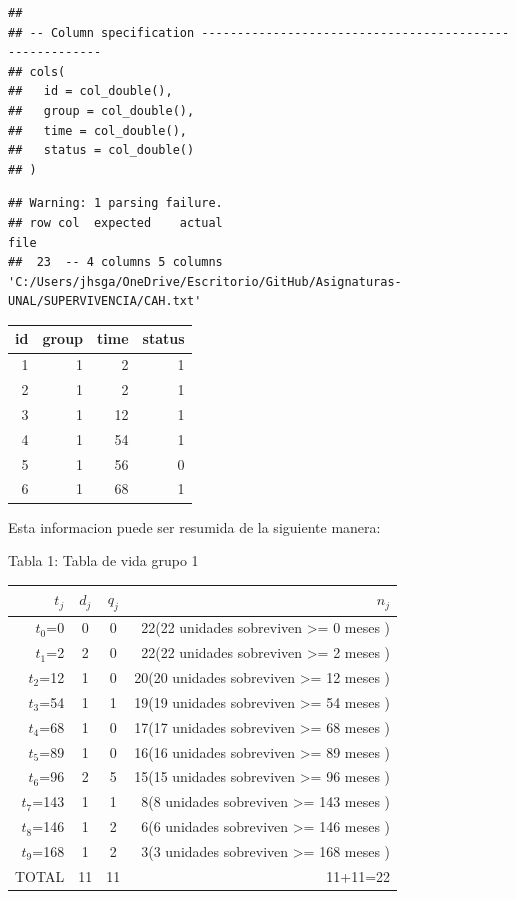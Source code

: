 \documentclass[
  12pt,
  letterpaper,
]{article}
\begin{document}
\begin{verbatim}
## 
## -- Column specification --------------------------------------------------------
## cols(
##   id = col_double(),
##   group = col_double(),
##   time = col_double(),
##   status = col_double()
## )
\end{verbatim}

\begin{verbatim}
## Warning: 1 parsing failure.
## row col  expected    actual                                                                               file
##  23  -- 4 columns 5 columns 'C:/Users/jhsga/OneDrive/Escritorio/GitHub/Asignaturas-UNAL/SUPERVIVENCIA/CAH.txt'
\end{verbatim}

\begin{tabular}{r|r|r|r}
\hline
id & group & time & status\\
\hline
1 & 1 & 2 & 1\\
\hline
2 & 1 & 2 & 1\\
\hline
3 & 1 & 12 & 1\\
\hline
4 & 1 & 54 & 1\\
\hline
5 & 1 & 56 & 0\\
\hline
6 & 1 & 68 & 1\\
\hline
\end{tabular}

Esta informacion puede ser resumida de la siguiente manera:

Tabla 1: Tabla de vida grupo 1

\begin{longtable}[]{@{}rccr@{}}
\toprule()
\(t_j\) & \(d_j\) & \(q_j\) & \(n_j\) \\
\midrule()
\endhead
\(t_0\)=0 & 0 & 0 & 22(22 unidades sobreviven \textgreater= 0 meses ) \\
\(t_1\)=2 & 2 & 0 & 22(22 unidades sobreviven \textgreater= 2 meses ) \\
\(t_2\)=12 & 1 & 0 & 20(20 unidades sobreviven \textgreater= 12 meses
) \\
\(t_3\)=54 & 1 & 1 & 19(19 unidades sobreviven \textgreater= 54 meses
) \\
\(t_4\)=68 & 1 & 0 & 17(17 unidades sobreviven \textgreater= 68 meses
) \\
\(t_5\)=89 & 1 & 0 & 16(16 unidades sobreviven \textgreater= 89 meses
) \\
\(t_6\)=96 & 2 & 5 & 15(15 unidades sobreviven \textgreater= 96 meses
) \\
\(t_7\)=143 & 1 & 1 & 8(8 unidades sobreviven \textgreater= 143 meses
) \\
\(t_8\)=146 & 1 & 2 & 6(6 unidades sobreviven \textgreater= 146 meses
) \\
\(t_9\)=168 & 1 & 2 & 3(3 unidades sobreviven \textgreater= 168 meses
) \\
TOTAL & 11 & 11 & 11+11=22 \\
\bottomrule()
\end{longtable}
\end{document}
